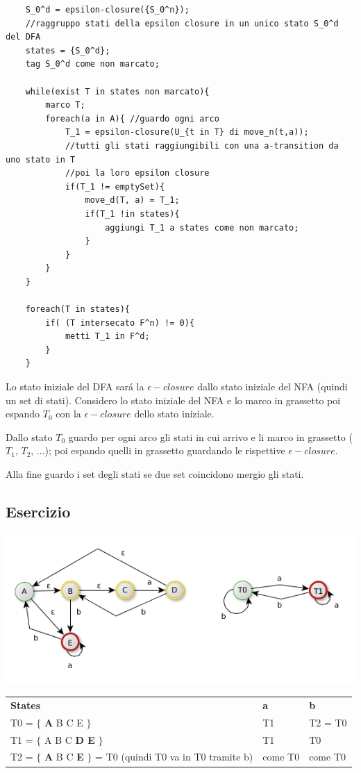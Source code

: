 \begin{lstlisting}
	S_0^d = epsilon-closure({S_0^n});	
    //raggruppo stati della epsilon closure in un unico stato S_0^d del DFA
	states = {S_0^d};
	tag S_0^d come non marcato;

	while(exist T in states non marcato){
		marco T;
		foreach(a in A){ //guardo ogni arco
			T_1 = epsilon-closure(U_{t in T} di move_n(t,a));
            //tutti gli stati raggiungibili con una a-transition da uno stato in T 
            //poi la loro epsilon closure
			if(T_1 != emptySet){
				move_d(T, a) = T_1;
		 		if(T_1 !in states){
					aggiungi T_1 a states come non marcato;
				}
			}
		}
	}

	foreach(T in states){
		if( (T intersecato F^n) != 0){
			metti T_1 in F^d;
		}
	}
\end{lstlisting}
Lo stato iniziale del DFA sar\'a la $\epsilon - closure$ dallo stato iniziale del NFA (quindi un set di stati).
Considero lo stato iniziale del NFA e lo marco in grassetto poi espando $T_0$ con la $\epsilon - closure$ dello stato iniziale. 

Dallo stato $T_0$ guardo per ogni arco gli stati in cui arrivo e li marco in grassetto ($T_1$, $T_2$, ...); 
poi espando quelli in grassetto guardando le rispettive $\epsilon - closure$.

Alla fine guardo i set degli stati se due set coincidono mergio gli stati.

\subsection{Esercizio}
\begin{center}
	\includegraphics[scale=0.5]{Chapters/Img/c02_05.png}\\
\end{center} 

\begin{tabular}{lll}
    \textbf{States}                                 &   \textbf{a}        &     \textbf{b} \\
    T0 = $\{$ \textbf{A} B C E $\}$                 &   T1                &     T2  = T0\\
    T1 = $\{$ A B C \textbf{D E} $\}$               &   T1                &     T0 \\
    T2 = $\{$ \textbf{A} B C \textbf{E} $\}$ = T0 (quindi T0 va in T0 tramite b) & come T0 & come T0 \\
\end{tabular}


